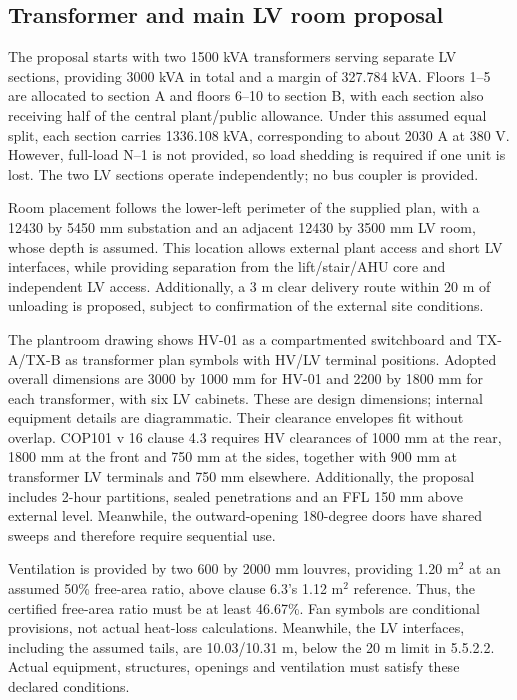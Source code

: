 \subsection*{Transformer and main LV room proposal}
The proposal starts with two 1500 kVA transformers serving separate LV sections, providing 3000 kVA in total and a margin of 327.784 kVA. Floors 1--5 are allocated to section A and floors 6--10 to section B, with each section also receiving half of the central plant/public allowance. Under this assumed equal split, each section carries 1336.108 kVA, corresponding to about 2030 A at 380 V. However, full-load N--1 is not provided, so load shedding is required if one unit is lost. The two LV sections operate independently; no bus coupler is provided.

Room placement follows the lower-left perimeter of the supplied plan, with a 12430 by 5450 mm substation and an adjacent 12430 by 3500 mm LV room, whose depth is assumed. This location allows external plant access and short LV interfaces, while providing separation from the lift/stair/AHU core and independent LV access. Additionally, a 3 m clear delivery route within 20 m of unloading is proposed, subject to confirmation of the external site conditions.

The plantroom drawing shows HV-01 as a compartmented switchboard and TX-A/TX-B as transformer plan symbols with HV/LV terminal positions. Adopted overall dimensions are 3000 by 1000 mm for HV-01 and 2200 by 1800 mm for each transformer, with six LV cabinets. These are design dimensions; internal equipment details are diagrammatic. Their clearance envelopes fit without overlap. COP101 v 16 clause 4.3 requires HV clearances of 1000 mm at the rear, 1800 mm at the front and 750 mm at the sides, together with 900 mm at transformer LV terminals and 750 mm elsewhere. Additionally, the proposal includes 2-hour partitions, sealed penetrations and an FFL 150 mm above external level. Meanwhile, the outward-opening 180-degree doors have shared sweeps and therefore require sequential use.

Ventilation is provided by two 600 by 2000 mm louvres, providing 1.20 m$^2$ at an assumed 50\% free-area ratio, above clause 6.3's 1.12 m$^2$ reference. Thus, the certified free-area ratio must be at least 46.67\%. Fan symbols are conditional provisions, not actual heat-loss calculations. Meanwhile, the LV interfaces, including the assumed tails, are 10.03/10.31 m, below the 20 m limit in 5.5.2.2. Actual equipment, structures, openings and ventilation must satisfy these declared conditions.

